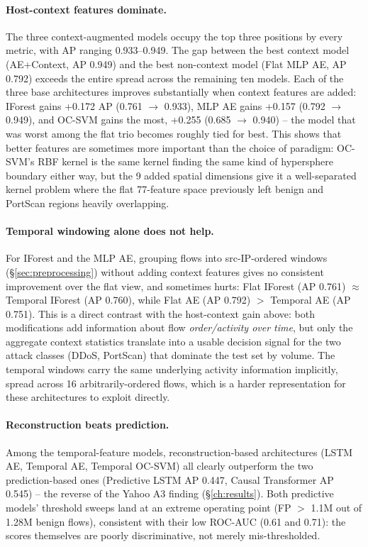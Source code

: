 \paragraph{Host-context features dominate.} The three context-augmented models occupy the top three positions by every metric, with AP ranging 0.933--0.949. The gap between the best context model (AE+Context, AP 0.949) and the best non-context model (Flat MLP AE, AP 0.792) exceeds the entire spread across the remaining ten models. Each of the three base architectures improves substantially when context features are added: IForest gains +0.172 AP (0.761 $\to$ 0.933), MLP AE gains +0.157 (0.792 $\to$ 0.949), and OC-SVM gains the most, +0.255 (0.685 $\to$ 0.940) -- the model that was worst among the flat trio becomes roughly tied for best. This shows that better features are sometimes more important than the choice of paradigm: OC-SVM's RBF kernel is the same kernel finding the same kind of hypersphere boundary either way, but the 9 added spatial dimensions give it a well-separated kernel problem where the flat 77-feature space previously left benign and PortScan regions heavily overlapping.

\paragraph{Temporal windowing alone does not help.} For IForest and the MLP AE, grouping flows into src-IP-ordered windows (\S\ref{sec:preprocessing}) without adding context features gives no consistent improvement over the flat view, and sometimes hurts: Flat IForest (AP 0.761) $\approx$ Temporal IForest (AP 0.760), while Flat AE (AP 0.792) $>$ Temporal AE (AP 0.751). This is a direct contrast with the host-context gain above: both modifications add information about flow \emph{order/activity over time}, but only the aggregate context statistics translate into a usable decision signal for the two attack classes (DDoS, PortScan) that dominate the test set by volume. The temporal windows carry the same underlying activity information implicitly, spread across 16 arbitrarily-ordered flows, which is a harder representation for these architectures to exploit directly.

\paragraph{Reconstruction beats prediction.} Among the temporal-feature models, reconstruction-based architectures (LSTM AE, Temporal AE, Temporal OC-SVM) all clearly outperform the two prediction-based ones (Predictive LSTM AP 0.447, Causal Transformer AP 0.545) -- the reverse of the Yahoo A3 finding (\S\ref{ch:results}). Both predictive models' threshold sweeps land at an extreme operating point (FP $>$ 1.1M out of 1.28M benign flows), consistent with their low ROC-AUC (0.61 and 0.71): the scores themselves are poorly discriminative, not merely mis-thresholded.

